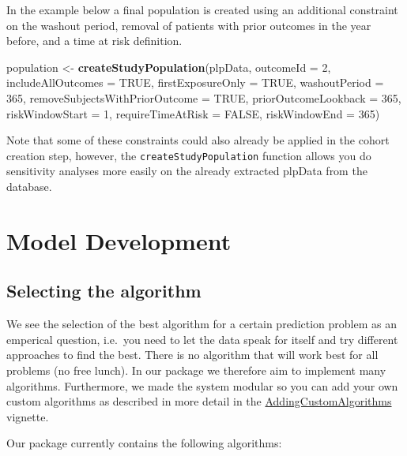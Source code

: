 \documentclass[]{article}
\newenvironment{Shaded}{\begin{snugshade}}{\end{snugshade}}
\newcommand{\KeywordTok}[1]{\textcolor[rgb]{0.13,0.29,0.53}{\textbf{#1}}}
\newcommand{\DataTypeTok}[1]{\textcolor[rgb]{0.13,0.29,0.53}{#1}}
\newcommand{\DecValTok}[1]{\textcolor[rgb]{0.00,0.00,0.81}{#1}}
\newcommand{\StringTok}[1]{\textcolor[rgb]{0.31,0.60,0.02}{#1}}
\newcommand{\OtherTok}[1]{\textcolor[rgb]{0.56,0.35,0.01}{#1}}
\newcommand{\NormalTok}[1]{#1}
\begin{document}
In the example below a final population is created using an additional
constraint on the washout period, removal of patients with prior
outcomes in the year before, and a time at risk definition.

\begin{Shaded}
\begin{Highlighting}[]
\NormalTok{population <-}\StringTok{ }\KeywordTok{createStudyPopulation}\NormalTok{(plpData, }
\DataTypeTok{outcomeId =} \DecValTok{2}\NormalTok{, }
\DataTypeTok{includeAllOutcomes =} \OtherTok{TRUE}\NormalTok{, }
\DataTypeTok{firstExposureOnly =} \OtherTok{TRUE}\NormalTok{, }
\DataTypeTok{washoutPeriod =} \DecValTok{365}\NormalTok{, }
\DataTypeTok{removeSubjectsWithPriorOutcome =} \OtherTok{TRUE}\NormalTok{, }
\DataTypeTok{priorOutcomeLookback =} \DecValTok{365}\NormalTok{,}
\DataTypeTok{riskWindowStart =} \DecValTok{1}\NormalTok{,}
\DataTypeTok{requireTimeAtRisk =} \OtherTok{FALSE}\NormalTok{,}
\DataTypeTok{riskWindowEnd =} \DecValTok{365}\NormalTok{)}
\end{Highlighting}
\end{Shaded}

Note that some of these constraints could also already be applied in the
cohort creation step, however, the \texttt{createStudyPopulation}
function allows you do sensitivity analyses more easily on the already
extracted plpData from the database.

\newpage

\section{Model Development}\label{model-development}

\subsection{Selecting the algorithm}\label{selecting-the-algorithm}

We see the selection of the best algorithm for a certain prediction
problem as an emperical question, i.e.~you need to let the data speak
for itself and try different approaches to find the best. There is no
algorithm that will work best for all problems (no free lunch). In our
package we therefore aim to implement many algorithms. Furthermore, we
made the system modular so you can add your own custom algorithms as
described in more detail in the
\href{Link\%20to\%20be\%20added}{AddingCustomAlgorithms} vignette.

Our package currently contains the following algorithms:
\end{document}
